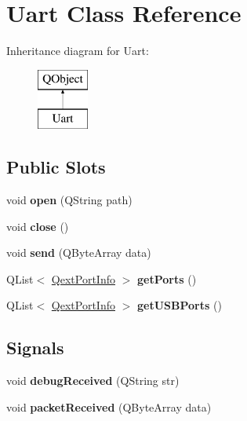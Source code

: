 \hypertarget{class_uart}{}\section{Uart Class Reference}
\label{class_uart}
Inheritance diagram for Uart\+:\begin{figure}[H]
\begin{center}
\leavevmode
\includegraphics[height=2.000000cm]{class_uart}
\end{center}
\end{figure}
\subsection*{Public Slots}
\begin{DoxyCompactItemize}
\item 
\mbox{\label{class_uart_a012b7ca256db6538396627e0a8d136cd}} 
void {\bfseries open} (Q\+String path)
\item 
\mbox{\label{class_uart_a5ae591df94fc66ccb85cbb6565368bca}} 
void {\bfseries close} ()
\item 
\mbox{\label{class_uart_aacbb4d0054339ab78e856d60823b5900}} 
void {\bfseries send} (Q\+Byte\+Array data)
\item 
\mbox{\label{class_uart_a6d8b9a5aece0a1419ceeef96e4401f88}} 
Q\+List$<$ \mbox{\hyperlink{struct_qext_port_info}{Qext\+Port\+Info}} $>$ {\bfseries get\+Ports} ()
\item 
\mbox{\label{class_uart_abd5c185dbc2eee213e273cf72282e707}} 
Q\+List$<$ \mbox{\hyperlink{struct_qext_port_info}{Qext\+Port\+Info}} $>$ {\bfseries get\+U\+S\+B\+Ports} ()
\end{DoxyCompactItemize}
\subsection*{Signals}
\begin{DoxyCompactItemize}
\item 
\mbox{\label{class_uart_a80e62a139ac8d5398a4622a9259db1c1}} 
void {\bfseries debug\+Received} (Q\+String str)
\item 
\mbox{\label{class_uart_abbc853f2eb86a7b1c860ae866a928d50}} 
void {\bfseries packet\+Received} (Q\+Byte\+Array data)
\end{DoxyCompactItemize}
